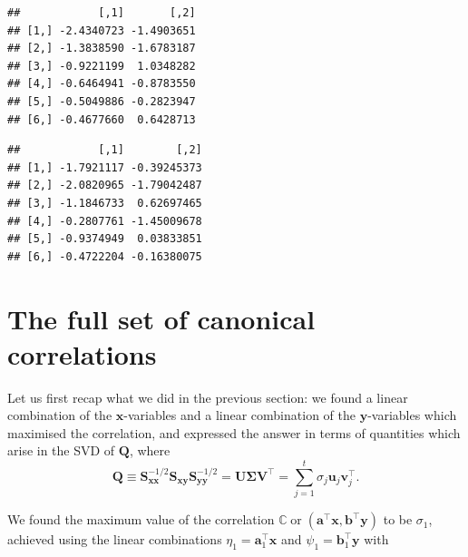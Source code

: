 \documentclass[
]{book}
\newenvironment{Shaded}{\begin{snugshade}}{\end{snugshade}}
\newcommand{\CommentTok}[1]{\textcolor[rgb]{0.56,0.35,0.01}{\textit{#1}}}
\newcommand{\FunctionTok}[1]{\textcolor[rgb]{0.13,0.29,0.53}{\textbf{#1}}}
\newcommand{\NormalTok}[1]{#1}
\newcommand{\SpecialCharTok}[1]{\textcolor[rgb]{0.81,0.36,0.00}{\textbf{#1}}}
\theoremstyle{definition}
\theoremstyle{definition}
\theoremstyle{definition}
\theoremstyle{definition}
\theoremstyle{remark}
\begin{document}
\begin{verbatim}
##            [,1]       [,2]
## [1,] -2.4340723 -1.4903651
## [2,] -1.3838590 -1.6783187
## [3,] -0.9221199  1.0348282
## [4,] -0.6464941 -0.8783550
## [5,] -0.5049886 -0.2823947
## [6,] -0.4677660  0.6428713
\end{verbatim}

\begin{Shaded}
\end{Shaded}

\begin{verbatim}
##            [,1]        [,2]
## [1,] -1.7921117 -0.39245373
## [2,] -2.0820965 -1.79042487
## [3,] -1.1846733  0.62697465
## [4,] -0.2807761 -1.45009678
## [5,] -0.9374949  0.03833851
## [6,] -0.4722204 -0.16380075
\end{verbatim}

\begin{Shaded}
\end{Shaded}

\section{The full set of canonical correlations}\label{the-full-set-of-canonical-correlations}

Let us first recap what we did in the previous section: we found a linear combination of the \(\mathbf x\)-variables and a linear combination of the \(\mathbf y\)-variables which
maximised the correlation, and expressed the answer in terms of quantities which arise in the SVD of \(\mathbf Q\), where
\[
\mathbf Q\equiv \mathbf S_{\mathbf x\mathbf x}^{-1/2} \mathbf S_{\mathbf x\mathbf y}\mathbf S_{\mathbf y\mathbf y}^{-1/2}=\mathbf U{\pmb \Sigma} \mathbf V^\top=\sum_{j=1}^t \sigma_j \mathbf u_j \mathbf v_j^\top.
\]

We found the maximum value of the correlation \({\mathbb{C}\operatorname{or}}(\mathbf a^\top\mathbf x, \mathbf b^\top\mathbf y)\) to be \(\sigma_1\), achieved using the linear combinations \(\eta_1=\mathbf a_1^\top \mathbf x\) and \(\psi_1=\mathbf b_1^\top \mathbf y\) with
\end{document}
